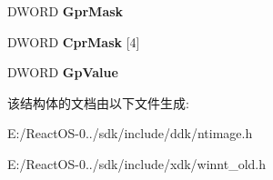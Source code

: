 \begin{DoxyCompactItemize}
D\+W\+O\+RD {\bfseries Gpr\+Mask}
\item 
\mbox{\label{struct___i_m_a_g_e___r_o_m___o_p_t_i_o_n_a_l___h_e_a_d_e_r_af433e98eab7c35f40f829c3ee0541c1e}} 
D\+W\+O\+RD {\bfseries Cpr\+Mask} \mbox{[}4\mbox{]}
\item 
\mbox{\label{struct___i_m_a_g_e___r_o_m___o_p_t_i_o_n_a_l___h_e_a_d_e_r_a1b2eb084b01e78a7164a269358b42616}} 
D\+W\+O\+RD {\bfseries Gp\+Value}
\end{DoxyCompactItemize}


该结构体的文档由以下文件生成\+:\begin{DoxyCompactItemize}
\item 
E\+:/\+React\+O\+S-\/0../sdk/include/ddk/ntimage.\+h\item 
E\+:/\+React\+O\+S-\/0../sdk/include/xdk/winnt\+\_\+old.\+h\end{DoxyCompactItemize}
